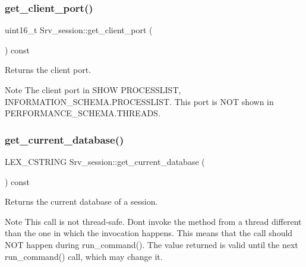 \subsubsection{\texorpdfstring{get\+\_\+client\+\_\+port()}{get\_client\_port()}}
{\footnotesize\ttfamily uint16\+\_\+t Srv\+\_\+session\+::get\+\_\+client\+\_\+port (\begin{DoxyParamCaption}{ }\end{DoxyParamCaption}) const\hspace{0.3cm}{\ttfamily [inline]}}

Returns the client port.

\begin{DoxyNote}{Note}
The client port in S\+H\+OW P\+R\+O\+C\+E\+S\+S\+L\+I\+ST, I\+N\+F\+O\+R\+M\+A\+T\+I\+O\+N\+\_\+\+S\+C\+H\+E\+M\+A.\+P\+R\+O\+C\+E\+S\+S\+L\+I\+ST. This port is N\+OT shown in P\+E\+R\+F\+O\+R\+M\+A\+N\+C\+E\+\_\+\+S\+C\+H\+E\+M\+A.\+T\+H\+R\+E\+A\+DS. 
\end{DoxyNote}
\mbox{\label{classSrv__session_a7da787fab7bb8d045441efa8e2c2aa3c}} 
\subsubsection{\texorpdfstring{get\+\_\+current\+\_\+database()}{get\_current\_database()}}
{\footnotesize\ttfamily L\+E\+X\+\_\+\+C\+S\+T\+R\+I\+NG Srv\+\_\+session\+::get\+\_\+current\+\_\+database (\begin{DoxyParamCaption}{ }\end{DoxyParamCaption}) const\hspace{0.3cm}{\ttfamily [inline]}}

Returns the current database of a session.

\begin{DoxyNote}{Note}
This call is not thread-\/safe. Don\textquotesingle{}t invoke the method from a thread different than the one in which the invocation happens. This means that the call should N\+OT happen during run\+\_\+command(). The value returned is valid until the next run\+\_\+command() call, which may change it. 
\end{DoxyNote}
\mbox{\label{classSrv__session_a9acafc348256db7c721c5a6f9d41dee2}} 
